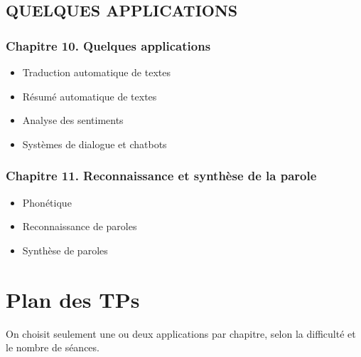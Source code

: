 \documentclass[11pt, a4paper]{article}
\begin{document}
\subsection*{\uppercase{Quelques applications}}

\begin{tcolorbox}
\subsubsection*{Chapitre 10. Quelques applications}

\begin{multicols}{2}
	\begin{itemize}	
		\item Traduction automatique de textes
		\item Résumé automatique de textes
		\item Analyse des sentiments
		\item Systèmes de dialogue et chatbots
	\end{itemize}
\end{multicols}
\end{tcolorbox}

\begin{tcolorbox}
	\subsubsection*{Chapitre 11. Reconnaissance et synthèse de la parole}
	
	\begin{multicols}{2}
		\begin{itemize}	
			\item Phonétique
			\item Reconnaissance de paroles
			\item Synthèse de paroles
		\end{itemize}
	\end{multicols}
\end{tcolorbox}

\section{Plan des TPs}

On choisit seulement une ou deux applications par chapitre, selon la difficulté et le nombre de séances.
\end{document}
